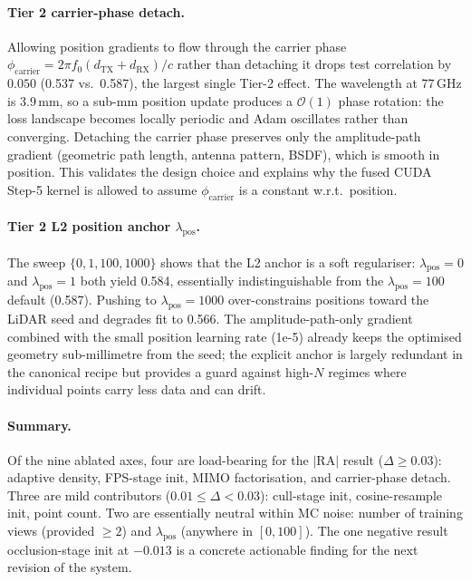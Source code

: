 \paragraph{Tier 2 \textemdash{} carrier-phase detach.} Allowing position gradients to flow through the carrier phase $\phi_{\text{carrier}} = 2\pi f_0 (d_{\text{TX}} + d_{\text{RX}})/c$ rather than detaching it drops test correlation by $0.050$ (0.537 vs.~0.587), the largest single Tier-2 effect. The wavelength at 77\,GHz is 3.9\,mm, so a sub-mm position update produces a $\mathcal{O}(1)$ phase rotation: the loss landscape becomes locally periodic and Adam oscillates rather than converging. Detaching the carrier phase preserves only the amplitude-path gradient (geometric path length, antenna pattern, BSDF), which is smooth in position. This validates the design choice and explains why the fused CUDA Step-5 kernel is allowed to assume $\phi_{\text{carrier}}$ is a constant w.r.t.~position.

\paragraph{Tier 2 \textemdash{} L2 position anchor $\lambda_{\mathrm{pos}}$.} The sweep $\{0, 1, 100, 1000\}$ shows that the L2 anchor is a soft regulariser: $\lambda_{\mathrm{pos}} = 0$ and $\lambda_{\mathrm{pos}} = 1$ both yield 0.584, essentially indistinguishable from the $\lambda_{\mathrm{pos}}{=}100$ default (0.587). Pushing to $\lambda_{\mathrm{pos}} = 1000$ over-constrains positions toward the LiDAR seed and degrades fit to 0.566. The amplitude-path-only gradient combined with the small position learning rate (1e-5) already keeps the optimised geometry sub-millimetre from the seed; the explicit anchor is largely redundant in the canonical recipe but provides a guard against high-$N$ regimes where individual points carry less data and can drift.

\paragraph{Summary.} Of the nine ablated axes, four are load-bearing for the $|\mathrm{RA}|$ result ($\Delta \geq 0.03$): adaptive density, FPS-stage init, MIMO factorisation, and carrier-phase detach. Three are mild contributors ($0.01 \leq \Delta < 0.03$): cull-stage init, cosine-resample init, point count. Two are essentially neutral within MC noise: number of training views (provided $\geq 2$) and $\lambda_{\mathrm{pos}}$ (anywhere in $[0, 100]$). The one negative result \textemdash{} occlusion-stage init at $-0.013$ \textemdash{} is a concrete actionable finding for the next revision of the system.

